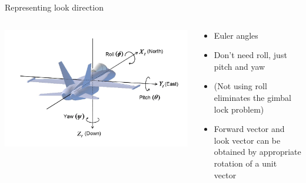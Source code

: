\begin{frame}{Representing look direction}
	\begin{columns}
		\pause
		\begin{column}{0.48\textwidth}
			\includegraphics[width=\textwidth]{../03/euler_aeroplane}
		\end{column}
		\begin{column}{0.48\textwidth}
			\begin{itemize}
				\pause\item Euler angles
				\pause\item Don't need roll, just pitch and yaw
				\pause\item (Not using roll eliminates the gimbal lock problem)
				\pause\item Forward vector and look vector can be obtained by appropriate rotation of a unit vector
			\end{itemize}
		\end{column}
	\end{columns}
\end{frame}
